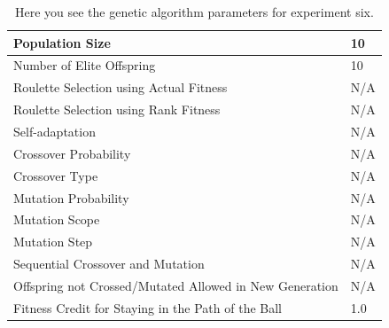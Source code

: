 \documentclass[a4paper,10pt]{article}
\begin{document}
\begin{table}[H]
\centering
\footnotesize
\begin{tabular}{ |>{\columncolor[gray]{0.8}} l | l| }
\hline
Population Size                                                      & 10                                                                       \\ \hline
Number of Elite Offspring                                            & 10                                                                       \\ \hline
Roulette Selection using Actual Fitness                              & N/A                                                                      \\ \hline
Roulette Selection using Rank Fitness                                & N/A                                                                      \\ \hline
Self-adaptation                                                      & N/A                                                                      \\ \hline
Crossover Probability                                                & N/A                                                                      \\ \hline
Crossover Type                                                       & N/A                                                                      \\ \hline
Mutation Probability                                                 & N/A                                                                      \\ \hline
Mutation Scope                                                       & N/A                                                                      \\ \hline
Mutation Step                                                        & N/A                                                                      \\ \hline
Sequential Crossover and Mutation                                    & N/A                                                       	              \\ \hline
Offspring not Crossed/Mutated Allowed in New Generation              & N/A                                                      	              \\ \hline
Fitness Credit for Staying in the Path of the Ball                   & 1.0                                                      	              \\ \hline
\end{tabular}
\caption{Here you see the genetic algorithm parameters for experiment six.}
\label{tab:exp6}
\end{table}
\end{document}
